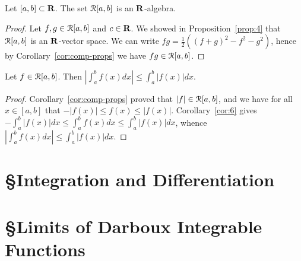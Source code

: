 \documentclass[10pt,twoside,openany]{memoir}
\begin{document}
    \begin{corollary}
        Let $[a,b] \subset \mathbf{R}$. The set $\mathcal{R}[a,b]$ is an $\mathbf{R}$-algebra.
    \end{corollary}
        \begin{proof}
            Let $f,g \in \mathcal{R}[a,b]$ and $c \in \mathbf{R}$. We showed in Proposition~\ref{prop:4} that $\mathcal{R}[a,b]$ is an $\mathbf{R}$-vector space. We can write $fg = \frac{1}{2}((f+g)^2 - f^2 - g^2)$, hence by Corollary~\ref{cor:comp-props} we have $fg \in \mathcal{R}[a,b]$.
        \end{proof}

    \begin{corollary}
        Let $f \in \mathcal{R}[a,b]$. Then $\left| \int_a^b f(x)dx \right| \leq \int_a^b |f(x)|dx$.
    \end{corollary}
        \begin{proof}
            Corollary~\ref{cor:comp-props} proved that $|f| \in \mathcal{R}[a,b]$, and we have for all $x \in [a,b]$ that $-|f(x)| \leq f(x) \leq |f(x)|$. Corollary~\ref{cor:6} gives $-\int_a^b |f(x)|dx \leq \int_a^b f(x)dx \leq \int_a^b|f(x)|dx$, whence $\left| \int_a^b f(x)dx \right| \leq \int_a^b |f(x)|dx$.
        \end{proof}

\section*{\S\:\:Integration and Differentiation}

\section*{\S\:\:Limits of Darboux Integrable Functions}
    \begin{example}
        
    \end{example}
\end{document}
